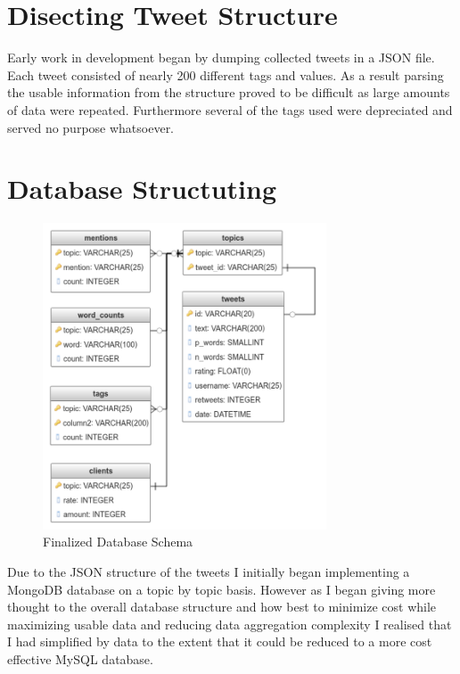 \documentclass[12pt,a4paper]{report}
\begin{document}
  \section{Disecting Tweet Structure}
  Early work in development began by dumping collected tweets in a JSON\cite{JSON} file. Each tweet consisted of nearly 200 different tags and values. As a result parsing the usable information from the structure proved to be difficult as large amounts of data were repeated. Furthermore several of the tags used were depreciated and served no purpose whatsoever. 
  \section{Database Structuting}
  \begin{figure}
    \centering
    \includegraphics[width=0.75\textwidth]{dber}
    \caption{Finalized Database Schema}
    \label{fig:dber}
  \end{figure}
  Due to the JSON\cite{JSON} structure of the tweets I initially began implementing a MongoDB database on a topic by topic basis. However as I began giving more thought to the overall database structure and how best to minimize cost while maximizing usable data and reducing data aggregation complexity I realised that I had simplified by data to the extent that it could be reduced to a more cost effective MySQL database.
\end{document}
